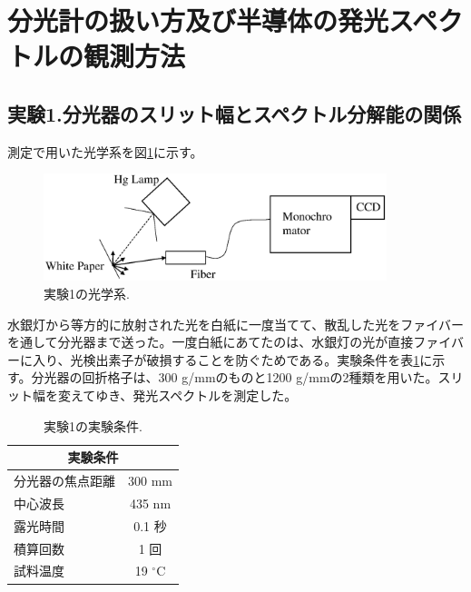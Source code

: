 \documentclass[11pt,a4j]{jsarticle}
\begin{document}
\newpage
\section{分光計の扱い方及び半導体の発光スペクトルの観測方法}

\subsection{実験1.分光器のスリット幅とスペクトル分解能の関係}


測定で用いた光学系を図\ref{fig_system1}に示す。

\begin{figure}[h]
 \centering
 \includegraphics[clip,width=10cm]{start_system1.eps}
 \caption{実験1の光学系.}
 \label{fig_system1}
\end{figure}

水銀灯から等方的に放射された光を白紙に一度当てて、散乱した光をファイバーを通して分光器まで送った。一度白紙にあてたのは、水銀灯の光が直接ファイバーに入り、光検出素子が破損することを防ぐためである。実験条件を表\ref{col_1}に示す。分光器の回折格子は、300 g/mmのものと1200 g/mmの2種類を用いた。スリット幅を変えてゆき、発光スペクトルを測定した。

\begin{table}[ht]
 \centering
 \caption{実験1の実験条件.}
 \begin{tabular}{lc}\hline
  \multicolumn{2}{c}{実験条件}      \\ \hline
  分光器の焦点距離 & 300 mm         \\
  中心波長         & 435 nm         \\
  露光時間         & 0.1 秒         \\
  積算回数         & 1 回           \\
  試料温度         & 19 ${}^\circ$C \\ \hline
 \end{tabular}
 \label{col_1}
\end{table}

\end{document}
